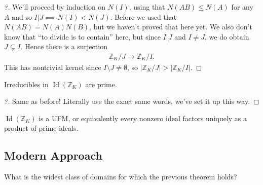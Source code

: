 \begin{proof}[?]

We'll proceed by induction on \(N(I)\), using that \(N(AB) \leq N(A)\)
for any \(A\) and so \(I\mathrel{\Big|}J \implies N(I) < N(J)\). Before
we used that \(N(AB) = N(A) N(B)\), but we haven't proved that here yet.
We also don't know that ``to divide is to contain'' here, but since
\(I\mathrel{\Big|}J\) and \(I\neq J\), we do obtain \(J \subsetneq I\).
Hence there is a surjection
\begin{align*}
{\mathbb{Z}}_K/J \to {\mathbb{Z}}_K/I
.\end{align*}
This has nontrivial kernel since \(I\setminus J \neq \emptyset\), so
\({\left\lvert {{\mathbb{Z}}_K/J} \right\rvert}> {\left\lvert {{\mathbb{Z}}_K/I} \right\rvert}\).

\end{proof}

\begin{lemma}

Irreducibles in \(\operatorname{Id}({\mathbb{Z}}_K)\) are prime.

\end{lemma}

\begin{proof}[?]

Same as before! Literally use the exact same words, we've set it up this
way.

\end{proof}

\begin{theorem}[?]

\(\operatorname{Id}({\mathbb{Z}}_K)\) is a UFM, or equivalently every
nonzero ideal factors uniquely as a product of prime ideals.

\end{theorem}

\hypertarget{modern-approach}{%
\subsection{Modern Approach}\label{modern-approach}}

\begin{remark}

What is the widest class of domains for which the previous theorem
holds?

\end{remark}

